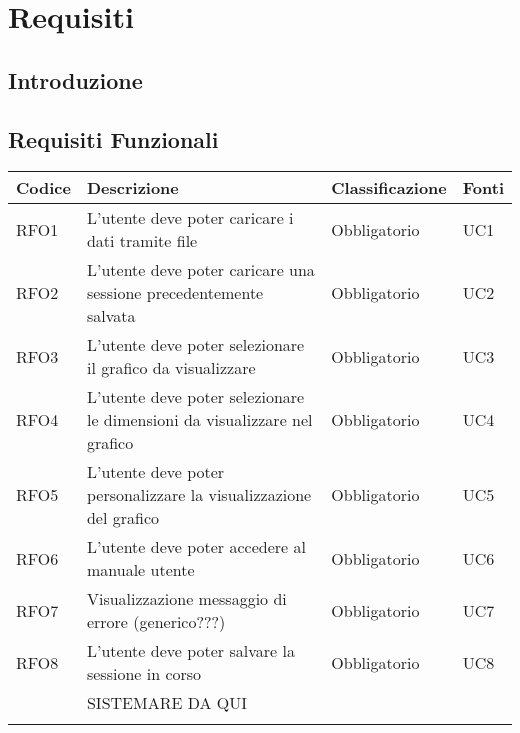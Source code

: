 \chapter{Requisiti}


\section{Introduzione}
\section{Requisiti Funzionali}
\begin{table}[H]
  \centering
  \begin{tabular}{|p{}|p{6cm}|p{3cm}|p{2cm}|}
    \hline
    \rowcolor[HTML]{036400}
    {\color[HTML]{FFFFFF} \textbf{Codice}} & {\color[HTML]{FFFFFF} \textbf{Descrizione}} & {\color[HTML]{FFFFFF} \textbf{Classificazione}} & {\color[HTML]{FFFFFF} \textbf{Fonti}} \\ \hline
    \rowcolor[HTML]{EFEFEF}
    RFO1 & L'utente deve poter caricare i dati tramite file & Obbligatorio & UC1 \\ \hline
    \rowcolor[HTML]{C0C0C0}
    RFO2 & L'utente deve poter caricare una sessione precedentemente salvata & Obbligatorio & UC2 \\ \hline
    \rowcolor[HTML]{EFEFEF}
    RFO3 & L'utente deve poter selezionare il grafico da visualizzare & Obbligatorio & UC3 \\ \hline
    \rowcolor[HTML]{C0C0C0}
    RFO4 & L'utente deve poter selezionare le dimensioni da visualizzare nel grafico & Obbligatorio & UC4 \\ \hline
    \rowcolor[HTML]{EFEFEF}
    RFO5 & L'utente deve poter personalizzare la visualizzazione del grafico & Obbligatorio & UC5 \\ \hline
    \rowcolor[HTML]{C0C0C0}
    RFO6 & L'utente deve poter accedere al manuale utente & Obbligatorio & UC6 \\ \hline
    \rowcolor[HTML]{EFEFEF}
    RFO7 & Visualizzazione messaggio di errore (generico???) & Obbligatorio & UC7 \\ \hline
    \rowcolor[HTML]{C0C0C0}
    RFO8 & L'utente deve poter salvare la sessione in corso & Obbligatorio & UC8 \\ \hline
    \rowcolor[HTML]{EFEFEF}
     & SISTEMARE DA QUI &  &  \\ \hline
    \rowcolor[HTML]{C0C0C0}

\end{tabular}
\end{table}

